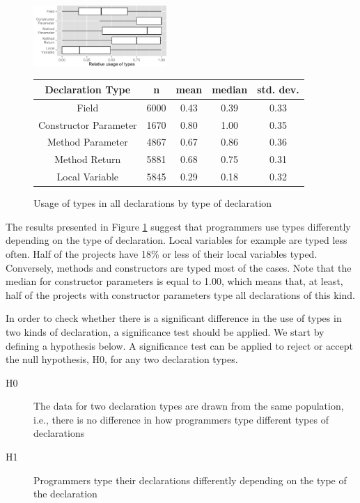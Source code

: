\documentclass[preprint]{sigplanconf}
\renewcommand{\arraystretch}{1.2}
\begin{document}
\begin{figure}[h]
\centering 
\includegraphics[width=0.45\textwidth]{../analysis/result/all/boxplots/6_declarations_by_type.png} 
\label{fig:all_boxplot_type} 

\vspace{0.3cm}

\renewcommand{\arraystretch}{1.2}
\small
\begin{tabular}{|c|c|c|c|c|}
\hline
Declaration Type		& n		& mean	& median		& std. dev.	\\
\hline
\hline
Field					& 6000	& 0.43	& 0.39		& 0.33		\\ \hline
Constructor Parameter	& 1670	& 0.80	& 1.00		& 0.35		\\ \hline
Method Parameter		& 4867	& 0.67	& 0.86		& 0.36		\\ \hline
Method Return			& 5881	& 0.68	& 0.75		& 0.31		\\ \hline
Local Variable			& 5845	& 0.29	& 0.18		& 0.32		\\ \hline
\end{tabular}

\caption{Usage of types in all declarations by type of declaration}

\end{figure}

The results presented in Figure \ref{fig:all_boxplot_type} suggest that programmers use types differently depending on the type of declaration.
Local variables for example are typed less often.
Half of the projects have 18\% or less of their local variables typed.
Conversely, methods and constructors are typed most of the cases.
Note that the median for constructor parameters is equal to 1.00, which means that, at least, half of the projects with constructor parameters type all declarations of this kind.

In order to check whether there is a significant difference in the use of types in two kinds of declaration, a significance test should be applied. 
We start by defining a hypothesis below. A significance test can be applied to reject or accept the null hypothesis, H0, for any two declaration types. 

\begin{description}
\item[H0] The data for two declaration types are drawn from the same population, i.e., there is no difference in how programmers type different types of declarations
\item[H1] Programmers type their declarations differently depending on the type of the declaration
\end{description}
\end{document}
